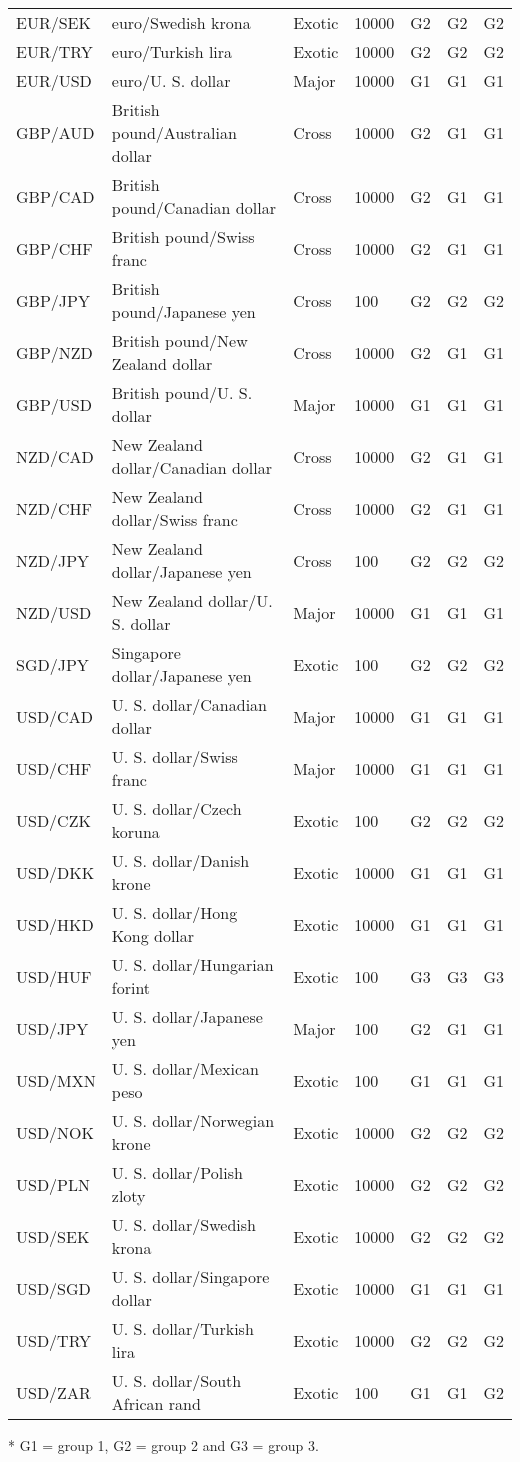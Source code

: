 \begin{table*}
\begin{center}
\begin{centering}
\begin{threeparttable}
\begin{tabular}{lllllll}
    EUR/SEK & euro/Swedish krona & Exotic & 10000 & G2 & G2 & G2\tabularnewline
    EUR/TRY & euro/Turkish lira & Exotic & 10000 & G2 & G2 & G2\tabularnewline
    EUR/USD & euro/U. S. dollar & Major & 10000 & G1 & G1 & G1\tabularnewline
    GBP/AUD & British pound/Australian dollar & Cross & 10000 & G2 & G1 & G1\tabularnewline
    GBP/CAD & British pound/Canadian dollar & Cross & 10000 & G2 & G1 & G1\tabularnewline
    GBP/CHF & British pound/Swiss franc & Cross & 10000 & G2 & G1 & G1\tabularnewline
    GBP/JPY & British pound/Japanese yen & Cross & 100 & G2 & G2 & G2\tabularnewline
    GBP/NZD & British pound/New Zealand dollar & Cross & 10000 & G2 & G1 & G1\tabularnewline
    GBP/USD & British pound/U. S. dollar & Major & 10000 & G1 & G1 & G1\tabularnewline
    NZD/CAD & New Zealand dollar/Canadian dollar & Cross & 10000 & G2 & G1 & G1\tabularnewline
    NZD/CHF & New Zealand dollar/Swiss franc & Cross & 10000 & G2 & G1 & G1\tabularnewline
    NZD/JPY & New Zealand dollar/Japanese yen & Cross & 100 & G2 & G2 & G2\tabularnewline
    NZD/USD & New Zealand dollar/U. S. dollar & Major & 10000 & G1 & G1 & G1\tabularnewline
    SGD/JPY & Singapore dollar/Japanese yen & Exotic & 100 & G2 & G2 & G2\tabularnewline
    USD/CAD & U. S. dollar/Canadian dollar & Major & 10000 & G1 & G1 & G1\tabularnewline
    USD/CHF & U. S. dollar/Swiss franc & Major & 10000 & G1 & G1 & G1\tabularnewline
    USD/CZK & U. S. dollar/Czech koruna & Exotic & 100 & G2 & G2 & G2\tabularnewline
    USD/DKK & U. S. dollar/Danish krone & Exotic & 10000 & G1 & G1 & G1\tabularnewline
    USD/HKD & U. S. dollar/Hong Kong dollar & Exotic & 10000 & G1 & G1 & G1\tabularnewline
    USD/HUF & U. S. dollar/Hungarian forint & Exotic & 100 & G3 & G3 & G3\tabularnewline
    USD/JPY & U. S. dollar/Japanese yen & Major & 100 & G2 & G1 & G1\tabularnewline
    USD/MXN & U. S. dollar/Mexican peso & Exotic & 100 & G1 & G1 & G1\tabularnewline
    USD/NOK & U. S. dollar/Norwegian krone & Exotic & 10000 & G2 & G2 & G2\tabularnewline
    USD/PLN & U. S. dollar/Polish zloty & Exotic & 10000 & G2 & G2 & G2\tabularnewline
    USD/SEK & U. S. dollar/Swedish krona & Exotic & 10000 & G2 & G2 & G2\tabularnewline
    USD/SGD & U. S. dollar/Singapore dollar & Exotic & 10000 & G1 & G1 & G1\tabularnewline
    USD/TRY & U. S. dollar/Turkish lira & Exotic & 10000 & G2 & G2 & G2\tabularnewline
    USD/ZAR & U. S. dollar/South African rand & Exotic & 100 & G1 & G1 & G2\tabularnewline
    \end{tabular}

    \begin{tablenotes}
    \item[*] G1 = group 1, G2 = group 2 and G3 = group 3.
    \end{tablenotes}
    \end{threeparttable}
\end{centering}
\end{center}
\end{table*}

